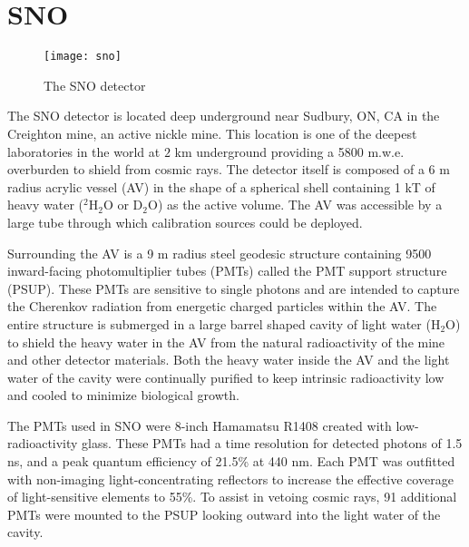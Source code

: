 \section{SNO}

\begin{figure}
\centering
    \texttt{[image: sno]}
    \caption{\label{fig:sno}The SNO detector \cite{3phase}}
\end{figure}

The SNO \cite{sno} detector is located deep underground near Sudbury, ON, CA in the Creighton mine, an active nickle mine.
This location is one of the deepest laboratories in the world at $2$ km underground providing a 5800 m.w.e. overburden to shield from cosmic rays.
The detector itself is composed of a 6 m radius acrylic vessel (AV) in the shape of a spherical shell containing 1 kT of heavy water ($^2$H$_2$O or D$_2$O) as the active volume.
The AV was accessible by a large tube through which calibration sources could be deployed.

Surrounding the AV is a 9 m radius steel geodesic structure containing 9500 inward-facing photomultiplier tubes (PMTs) called the PMT support structure (PSUP).
These PMTs are sensitive to single photons and are intended to capture the Cherenkov radiation from energetic charged particles within the AV.
The entire structure is submerged in a large barrel shaped cavity of light water (H$_2$O) to shield the heavy water in the AV from the natural radioactivity of the mine and other detector materials.
Both the heavy water inside the AV and the light water of the cavity were continually purified to keep intrinsic radioactivity low and cooled to minimize biological growth.

The PMTs used in SNO were 8-inch Hamamatsu R1408 created with low-radioactivity glass. 
These PMTs had a time resolution for detected photons of 1.5 ns, and a peak quantum efficiency of 21.5\% at 440 nm.
Each PMT was outfitted with non-imaging light-concentrating reflectors to increase the effective coverage of light-sensitive elements to 55\%.
To assist in vetoing cosmic rays, 91 additional PMTs were mounted to the PSUP looking outward into the light water of the cavity. 


